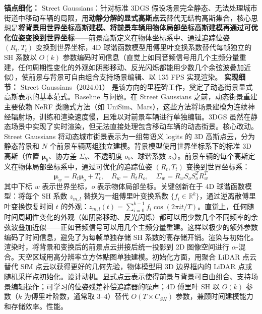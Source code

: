 \textbf{锚点细化：} Street Gaussians：针对标准 3DGS 假设场景完全静态、无法处理城市街道中移动车辆的局限，用\textbf{动静分解的显式高斯点云}替代无结构高斯集合，核心思想是\textbf{将背景用世界坐标高斯建模、将前景车辆用物体局部坐标高斯建模再通过可优化位姿变换到世界坐标}——前景高斯定义在物体坐标系中、通过追踪位姿 $(R_t, T_t)$ 变换到世界坐标，4D 球谐函数模型用傅里叶变换系数替代每帧独立的 SH 系数以 $O(k)$ 参数编码时间信息（直觉上如同音频信号用几个主频分量重建，任何周期性变化的外观如阴影移动、反光闪烁都能用少数几个余弦波叠加近似），使前景与背景可自由组合支持场景编辑、以 135 FPS 实现渲染。
\textbf{实现细节：} Street Gaussians（2024.01） 是该方向的里程碑工作，奠定了动态街景显式高斯表示的基本范式。Baseline 与问题。在 Street Gaussians 之前，动态街景重建主要依赖 NeRF 类隐式方法（如 UniSim、Mars），这些方法将场景建模为连续神经辐射场，训练和渲染速度慢，且难以对前景车辆进行单独编辑。3DGS 虽然在静态场景中实现了实时渲染，但无法直接处理包含移动车辆的动态街景。核心改动。Street Gaussians 将动态城市街景表示为一组带语义 logits 的 3D 高斯点云，分为静态背景和 $N$ 个前景车辆两组独立建模。背景模型使用世界坐标系下的标准 3D 高斯（位置 $\boldsymbol{\mu}_b$、协方差 $\Sigma_b$、不透明度 $o_b$、球谐系数 $z_b$）。前景车辆的每个高斯定义在物体局部坐标系中，通过可优化的追踪位姿 $(R_t, T_t)$ 变换到世界坐标系： \begin{equation*} \boldsymbol{\mu}_w = R_t \boldsymbol{\mu}_o + T_t, \quad R_w = R_t R_o, \quad \Sigma_w = R_w S_o S_o^T R_w^T \end{equation*} 其中下标 $w$ 表示世界坐标，$o$ 表示物体局部坐标。关键创新在于 4D 球谐函数模型：将每个 SH 系数 $z_{m,l}$ 替换为一组傅里叶变换系数 $\{f_i \in \mathbb{R}^k\}$，通过逆离散傅里叶变换恢复时间 $t$ 的外观：$z_{m,l}(t) = \sum_{i=0}^{k-1} f_i \cos(2\pi i t / T)$。直觉上，任何随时间周期性变化的外观（如阴影移动、反光闪烁）都可以用少数几个不同频率的余弦波叠加近似——正如音频信号可以用几个主频分量重建。这样以极少的额外参数编码了时间信息，避免了为每帧单独存储 SH 系数的高存储开销。渲染与初始化。渲染时，将背景和变换后的前景点云拼接后统一投影到 2D 图像空间进行 $\alpha$-混合。天空区域用高分辨率立方体贴图单独建模。初始化方面，用聚合 LiDAR 点云替代 SfM 点云以获得更好的几何先验，物体模型用 3D 边界框内的 LiDAR 点或随机采样点初始化。设计动机。显式点云表示使得前景与背景可自由组合、支持场景编辑操作；可学习的位姿残差补偿追踪器的噪声；4D 傅里叶 SH 以 $O(k)$ 参数（$k$ 为傅里叶阶数，通常取 3--4）替代 $O(T \times C_{SH})$ 参数，兼顾时间建模能力和存储效率。性能。
